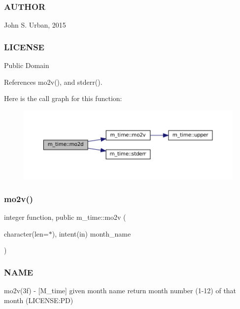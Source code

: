 \subsubsection*{A\+U\+T\+H\+OR}

John S. Urban, 2015 \subsubsection*{L\+I\+C\+E\+N\+SE}

Public Domain 

References mo2v(), and stderr().

Here is the call graph for this function\+:\nopagebreak
\begin{figure}[H]
\begin{center}
\leavevmode
\includegraphics[width=350pt]{namespacem__time_a8188c7ed4e592c4f2388d28c75486726_cgraph}
\end{center}
\end{figure}
\mbox{\label{namespacem__time_ad7bf0886754757e8961e562f06cf3bb7}} 
\subsubsection{\texorpdfstring{mo2v()}{mo2v()}}
{\footnotesize\ttfamily integer function, public m\+\_\+time\+::mo2v (\begin{DoxyParamCaption}\item[{character(len=$\ast$), intent(in)}]{month\+\_\+name }\end{DoxyParamCaption})}



\subsubsection*{N\+A\+ME}

mo2v(3f) -\/ \mbox{[}M\+\_\+time\mbox{]} given month name return month number (1-\/12) of that month (L\+I\+C\+E\+N\+SE\+:PD) 

